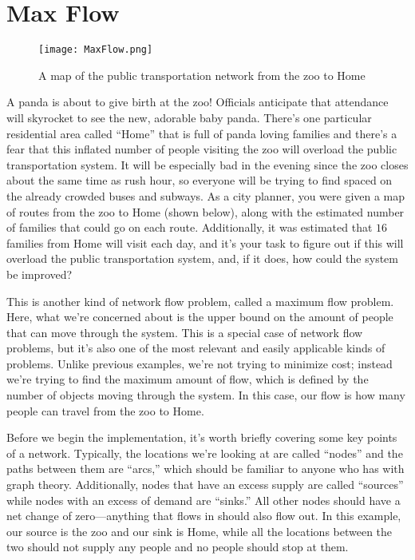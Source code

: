 \documentclass{article}
\begin{document}
\section*{Max Flow}

\begin{figure}
\begin{center}
 \texttt{[image: MaxFlow.png]}
\end{center}
\caption{A map of the public transportation network from the zoo to Home}
\end{figure} 

A panda is about to give birth at the zoo!  Officials anticipate that attendance will skyrocket to see the new, adorable baby panda.  There's one particular residential area called ``Home'' that is full of panda loving families and there's a fear that this inflated number of people visiting the zoo will overload the public transportation system.  It will be especially bad in the evening since the zoo closes about the same time as rush hour, so everyone will be trying to find spaced on the already crowded buses and subways.  As a city planner, you were given a map of routes from the zoo to Home (shown below), along with the estimated number of families that could go on each route.  Additionally, it was estimated that $16$ families from Home will visit each day, and it's your task to figure out if this will overload the public transportation system, and, if it does, how could the system be improved?

This is another kind of network flow problem, called a maximum flow problem.  Here, what we're concerned about is the upper bound on the amount of people that can move through the system.  This is a special case of network flow problems, but it's also one of the most relevant and easily applicable kinds of problems.  Unlike previous examples, we're not trying to minimize cost; instead we're trying to find the maximum amount of flow, which is defined by the number of objects moving through the system.  In this case, our flow is how many people can travel from the zoo to Home.

Before we begin the implementation, it's worth briefly covering some key points of a network.  Typically, the locations we're looking at are called ``nodes'' and the paths between them are ``arcs,'' which should be familiar to anyone who has with graph theory.  Additionally, nodes that have an excess supply are called ``sources'' while nodes with an excess of demand are ``sinks.''  All other nodes should have a net change of zero---anything that flows in should also flow out.  In this example, our source is the zoo and our sink is Home, while all the locations between the two should not supply any people and no people should stop at them.
\end{document}
